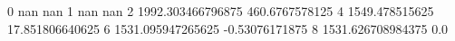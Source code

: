 0 nan nan
1 nan nan
2 1992.303466796875 460.6767578125
4 1549.478515625 17.851806640625
6 1531.095947265625 -0.53076171875
8 1531.626708984375 0.0
